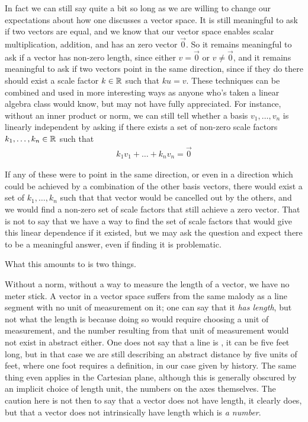 \documentclass[11pt]{article}
\begin{document}
In fact we can still say quite a bit so long as we are willing to change our expectations about how one discusses a vector space. It is still meaningful to ask if two vectors are equal, and we know that our vector space enables scalar multiplication, addition, and has an zero vector $\vec 0$. So it remains meaningful to ask if a vector has non-zero length, since either $v = \vec 0$ or $v \neq \vec 0$, and it remains meaningful to ask if two vectors point in the same direction, since if they do there should exist a scale factor $k \in \mathbb{R}$ such that $k u = v$. These techniques can be combined and used in more interesting ways as anyone who's taken a linear algebra class would know, but may not have fully appreciated. For instance, without an inner product or norm, we can still tell whether a basis $v_1, \dots, v_n$ is linearly independent by asking if there exists a set of non-zero scale factors $k_1, \dots, k_n \in \mathbb{R}$ such that \begin{gather*}
k_1 v_1 + \dots + k_n v_n = \vec 0
\end{gather*}

If any of these were to point in the same direction, or even in a direction which could be achieved by a combination of the other basis vectors, there would exist a set of $k_1, \dots, k_n$ such that that vector would be cancelled out by the others, and we would find a non-zero set of scale factors that still achieve a zero vector. That is not to say that we have a way to find the set of scale factors that would give this linear dependence if it existed, but we may ask the question and expect there to be a meaningful answer, even if finding it is problematic.

What this amounts to is two things.

Without a norm, without a way to measure the length of a vector, we have no meter stick. A vector in a vector space suffers from the same malody as a line segment with no unit of measurement on it; one can say that it \emph{has length}, but not what the length is because doing so would require choosing a unit of measurement, and the number resulting from that unit of measurement would not exist in abstract either. One does not say that a line is , it can be five feet long, but in that case we are still describing an abstract distance by five units of feet, where one foot requires a definition, in our case given by history. The same thing even applies in the Cartesian plane, although this is generally obscured by an implicit choice of length unit, the numbers on the axes themselves. The caution here is not then to say that a vector does not have length, it clearly does, but that a vector does not intrinsically have length which is \emph{a number}.
\end{document}

